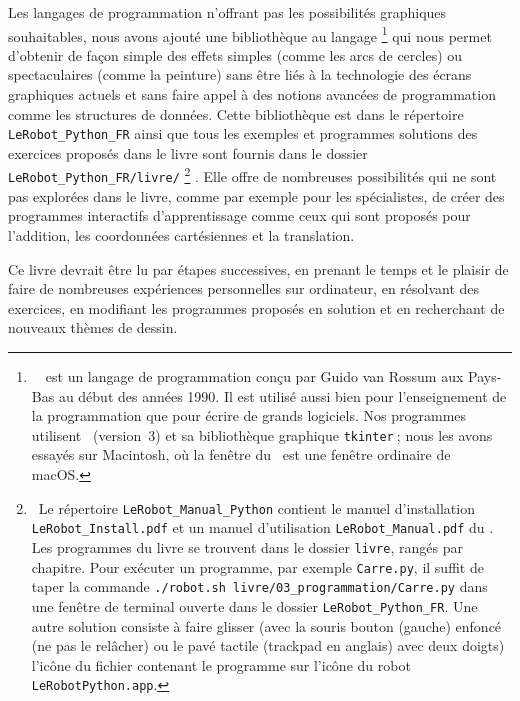 Les langages de programmation n'offrant pas les possibilités graphiques 
souhaitables, nous avons ajouté une bi\-blio\-thè\-que au langage \python\@%
%
\footnote{\ \python\ est un langage de programmation conçu par Guido van Rossum
aux Pays-Bas au début des années 1990. Il est utilisé aussi bien pour l'enseignement de la programmation que pour 
écrire de grands logiciels. Nos programmes utilisent \python\ (version~3) et sa 
bibliothèque graphique {\tt tkinter}$\:$; nous les avons essayés sur Macintosh, où la fenêtre 
du \robot\ est une fenêtre ordinaire de macOS.}
%
qui nous permet
d'obtenir de façon simple des effets simples (comme les arcs de cercles) ou
spectaculaires (comme la peinture) sans être liés à la technologie des
écrans graphiques actuels et sans faire appel à des notions avancées de
programmation comme les structures de données. Cette bibliothèque est dans
le répertoire \texttt{LeRobot\_Python\_FR} ainsi
que tous les exemples et programmes solutions des exercices proposés dans le livre
sont fournis dans le dossier {\tt LeRobot\_Python\_FR/livre/}%
%
\footnote{\ Le répertoire \texttt{LeRobot\_Manual\_Python} contient le manuel d'installation 
\texttt{LeRobot\_Install.pdf} et un manuel d'utilisation \texttt{LeRobot\_Manual.pdf} du \robot. Les programmes du livre se trouvent dans le dossier 
{\tt livre}, rangés par chapitre. Pour exécuter un programme, par exemple 
{\tt Carre.py}, il suffit de taper la commande {\tt ./robot.sh livre/03\_programmation/Carre.py} 
dans une fenêtre de terminal ouverte dans le dossier {\tt LeRobot\_Python\_FR}. Une autre solution
consiste à faire glisser (avec la souris bouton (gauche) enfoncé (ne pas le relâcher) ou le pavé tactile (trackpad en anglais) avec deux doigts) l'icône du fichier contenant le programme sur l'icône du robot \texttt{LeRobotPython.app}.}%
. Elle offre de nombreuses possibilités qui ne sont pas explorées dans le livre,
comme par exemple pour les spécialistes, de créer des programmes interactifs d'apprentissage
comme ceux qui sont proposés pour l'addition, les coordonnées cartésiennes et la
translation.

\medskip

Ce livre devrait être lu par étapes successives, en prenant le temps et le plaisir 
de faire de nombreuses expériences personnelles sur ordinateur, en résolvant des exercices,
en modifiant les programmes proposés en solution et en
recherchant de nouveaux thèmes de dessin.


\vspace{1.0cm}

